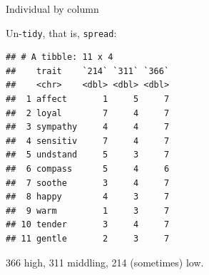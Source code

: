 \documentclass[ignorenonframetext,]{beamer}
\newenvironment{Shaded}{\begin{snugshade}}{\end{snugshade}}
\newcommand{\DataTypeTok}[1]{\textcolor[rgb]{0.13,0.29,0.53}{#1}}
\newcommand{\DecValTok}[1]{\textcolor[rgb]{0.00,0.00,0.81}{#1}}
\newcommand{\FloatTok}[1]{\textcolor[rgb]{0.00,0.00,0.81}{#1}}
\newcommand{\KeywordTok}[1]{\textcolor[rgb]{0.13,0.29,0.53}{\textbf{#1}}}
\newcommand{\NormalTok}[1]{#1}
\newcommand{\OperatorTok}[1]{\textcolor[rgb]{0.81,0.36,0.00}{\textbf{#1}}}
\newcommand{\StringTok}[1]{\textcolor[rgb]{0.31,0.60,0.02}{#1}}
\begin{document}
\begin{frame}[fragile]{Individual by column}
\protect\hypertarget{individual-by-column}{}

Un-\texttt{tidy}, that is, \texttt{spread}:

\tiny

\begin{Shaded}
\end{Shaded}

\begin{verbatim}
## # A tibble: 11 x 4
##    trait    `214` `311` `366`
##    <chr>    <dbl> <dbl> <dbl>
##  1 affect       1     5     7
##  2 loyal        7     4     7
##  3 sympathy     4     4     7
##  4 sensitiv     7     4     7
##  5 undstand     5     3     7
##  6 compass      5     4     6
##  7 soothe       3     4     7
##  8 happy        4     3     7
##  9 warm         1     3     7
## 10 tender       3     4     7
## 11 gentle       2     3     7
\end{verbatim}

\normalsize

366 high, 311 middling, 214 (sometimes) low.

\end{frame}
\end{document}
